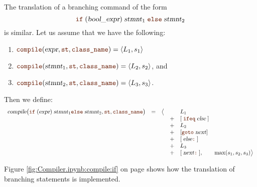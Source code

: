 The translation of a branching command of the form
\[ \mytt{if}\; (\textsl{bool\_expr})\; \textsl{stmnt}_1\; \mytt{else}\; \textsl{stmnt}_2 \]
is similar.  Let us assume that we have the following:
\begin{enumerate}
\item $\mytt{compile}(\textsl{expr}, \mytt{st}, \mytt{class\_name}) = \pair(L_1, s_1)$
\item $\mytt{compile}(\textsl{stmnt}_1, \mytt{st}, \mytt{class\_name}) = \pair(L_2, s_2)$, and
\item $\mytt{compile}(\textsl{stmnt}_2, \mytt{st}, \mytt{class\_name}) = \pair(L_3, s_3)$.
\end{enumerate}
Then we define:
\[
   \begin{array}[t]{lcccl}
   \textsl{compile}\bigl(\mytt{if}\; (\textsl{expr})\;\textsl{stmnt}_1\mytt{else}\;\textsl{stmnt}_2, \mytt{st}, \mytt{class\_name}\bigr) & = & \bigl\langle & & L_1  \\
   &&& + & [\;\mytt{ifeq}\;\textsl{else}\;] \\
   &&& + & L_2 \\
   &&& + & [\mytt{goto}\;\textsl{next}] \\
   &&& + & [\;\textsl{else}\mytt{:}\;] \\
   &&& + & L_3 \\
   &&& + & [\;\textsl{next}\mytt{:}\;], \qquad \max(s_1, s_2, s_3) \bigr\rangle        
\end{array}
\]

Figure \ref{fig:Compiler.ipynb:compile:if} on page \pageref{fig:Compiler.ipynb:compile:if} shows how the
translation of branching statements is implemented.

